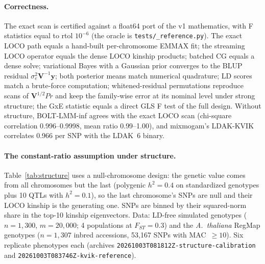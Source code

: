 \documentclass[11pt]{article}
\newcommand{\y}{\mathbf{y}}
\newcommand{\V}{\mathbf{V}}
\begin{document}
\paragraph{Correctness.} The exact scan is certified against a float64
port of the v1 mathematics, with F statistics equal to rtol $10^{-6}$
(the oracle is \texttt{tests/\allowbreak\_reference.py}). The exact LOCO path equals a hand-built per-chromosome
EMMAX fit; the streaming LOCO operator equals the dense LOCO kinship
products; batched CG equals a dense solve; variational Bayes with a
Gaussian prior converges to the BLUP residual
$\sigma_e^2\V^{-1}\y$; both posterior means match numerical quadrature;
LD scores match a brute-force computation; whitened-residual
permutations reproduce scans of $\V^{1/2}P r$ and keep the family-wise
error at its nominal level under strong structure; the GxE statistic
equals a direct GLS F test of the full design. Without structure,
BOLT-LMM-inf agrees with the exact LOCO scan (chi-square correlation
0.996--0.9998, mean ratio 0.99--1.00), and mixmogam's LDAK-KVIK correlates
0.966 per SNP with the LDAK~6 binary.

\paragraph{The constant-ratio assumption under structure.}
Table~\ref{tab:structure} uses a null-chromosome design: the genetic
value comes from all chromosomes but the last (polygenic $h^2 = 0.4$ on
standardized genotypes plus 10 QTLs with $h^2 = 0.1$), so the last
chromosome's SNPs are null and their LOCO kinship is the generating one.
SNPs are binned by their squared-norm share in the top-10 kinship
eigenvectors. Data: LD-free simulated genotypes ($n = 1{,}300$,
$m = 20{,}000$; 4 populations at $F_{ST} = 0.3$) and the \emph{A.\
thaliana} RegMap genotypes ($n = 1{,}307$ inbred accessions, 53{,}167 SNPs
with MAC~$\ge 10$). Six replicate phenotypes each (archives
\texttt{20261003T081812Z-structure-calibration} and
\texttt{20261003T083746Z-kvik-reference}).
\end{document}
